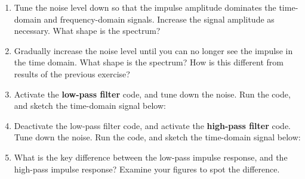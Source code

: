 \documentclass[10.5pt]{article}
\begin{document}
\begin{enumerate}
\item Tune the noise level down so that the impulse amplitude dominates the time-domain and frequency-domain signals.  Increase the signal amplitude as necessary.  What shape is the spectrum?
\item Gradually increase the noise level until you can no longer see the impulse in the time domain.  What shape is the spectrum?  How is this different from results of the previous exercise?
\item Activate the \textbf{low-pass filter} code, and tune down the noise.  Run the code, and sketch the time-domain signal below: \\ \vspace{5cm}
\item Deactivate the low-pass filter code, and activate the \textbf{high-pass filter} code.  Tune down the noise.  Run the code, and sketch the time-domain signal below: \\ \vspace{5cm}
\item What is the key difference between the low-pass impulse response, and the high-pass impulse response?  Examine your figures to spot the difference.
\end{enumerate}
\end{document}
